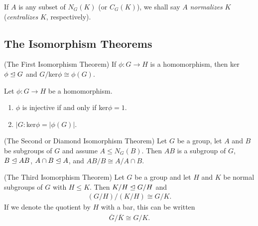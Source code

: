 \documentclass[../main]{subfiles}
\begin{document}
  
  \begin{dfn}
   If $A$ is any subset of $N_G(K)$ (or $C_G(K)$), we shall say $A$ \textit{normalizes} $K$ (\textit{centralizes} $K$, respectively).
  \end{dfn}
  
  
  \subsection{The Isomorphism Theorems}
  
  
  \begin{thm}
   (The First Isomorphism Theorem) If $\phi \colon G\to H$ is a homomorphism, then ker$\phi \trianglelefteq G$ and $G/$ker$\phi \cong \phi(G)$.
  \end{thm}
  
  
  \begin{cor}
   Let $\phi \colon G\to H$ be a homomorphism.
   \begin{enumerate}
    \item $\phi$ is injective if and only if ker$\phi = 1$.
    \item $|G:$ker$\phi = |\phi(G)|$.
   \end{enumerate}
  \end{cor}
  
  
  \begin{thm}
   (The Second or Diamond Isomorphism Theorem) Let $G$ be a group, let $A$ and $B$ be subgroups of $G$ and assume $A\leq N_G(B)$. Then $AB$ is a subgroup of $G$, $B \trianglelefteq AB$, $A \cap B \trianglelefteq A$, and $AB/B \cong A/A\cap B$.
  \end{thm}
  
  
  \begin{thm}
   (The Third Isomorphism Theorem) Let $G$ be a group and let $H$ and $K$ be normal subgroups of $G$ with $H\leq K$. Then $K/H \trianglelefteq G/H$ and 
   \begin{align*}
    (G/H)/(K/H) \cong G/K.
   \end{align*}
   If we denote the quotient by $H$ with a bar, this can be written
   \begin{align*}
    \overline{G}/\overline{K} \cong G/K.
   \end{align*}
  \end{thm}
  
\end{document}
